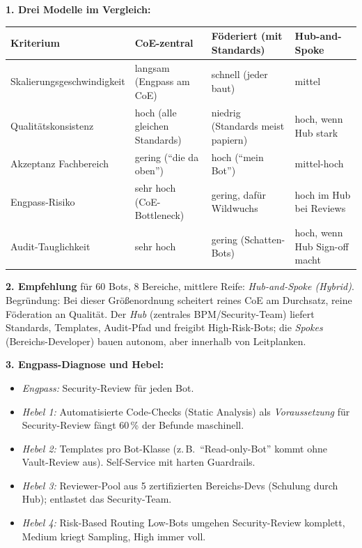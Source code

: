 \documentclass[11pt,a4paper,oneside]{article}
\begin{document}
\begin{loesungbox}
\textbf{1. Drei Modelle im Vergleich:}

\smallskip
\begin{tabularx}{\linewidth}{@{}p{3.0cm}XXX@{}}
\toprule
\textbf{Kriterium} & \textbf{CoE-zentral} & \textbf{F\"oderiert (mit Standards)} & \textbf{Hub-and-Spoke} \\
\midrule
Skalierungs\-geschwindigkeit & langsam (Engpass am CoE) & schnell (jeder baut) & mittel \\
Qualit\"atskonsistenz  & hoch (alle gleichen Standards) & niedrig (Standards meist papiern) & hoch, wenn Hub stark \\
Akzeptanz Fachbereich  & gering (``die da oben'')        & hoch (``mein Bot'')               & mittel-hoch \\
Engpass-Risiko         & sehr hoch (CoE-Bottleneck)      & gering, daf\"ur Wildwuchs         & hoch im Hub bei Reviews \\
Audit-Tauglichkeit     & sehr hoch                       & gering (Schatten-Bots)            & hoch, wenn Hub Sign-off macht \\
\bottomrule
\end{tabularx}

\smallskip
\textbf{2. Empfehlung} f\"ur 60 Bots, 8 Bereiche, mittlere Reife: \emph{Hub-and-Spoke (Hybrid)}. Begr\"undung: Bei dieser Gr\"o{\ss}enordnung scheitert reines CoE am Durchsatz, reine F\"oderation an Qualit\"at. Der \emph{Hub} (zentrales BPM/Security-Team) liefert Standards, Templates, Audit-Pfad und freigibt High-Risk-Bots; die \emph{Spokes} (Bereichs-Developer) bauen autonom, aber innerhalb von Leitplanken.

\smallskip
\textbf{3. Engpass-Diagnose und Hebel:}
\begin{itemize}
  \item \emph{Engpass:} Security-Review f\"ur jeden Bot.
  \item \emph{Hebel 1:} Automatisierte Code-Checks (Static Analysis) als \emph{Voraussetzung} f\"ur Security-Review \textendash{} f\"angt 60\,\% der Befunde maschinell.
  \item \emph{Hebel 2:} Templates pro Bot-Klasse (z.\,B.\ ``Read-only-Bot'' kommt ohne Vault-Review aus). Self-Service mit harten Guardrails.
  \item \emph{Hebel 3:} Reviewer-Pool aus 5 zertifizierten Bereichs-Devs (Schulung durch Hub); entlastet das Security-Team.
  \item \emph{Hebel 4:} Risk-Based Routing \textendash{} Low-Bots umgehen Security-Review komplett, Medium kriegt Sampling, High immer voll.
\end{itemize}


\end{loesungbox}
\end{document}
